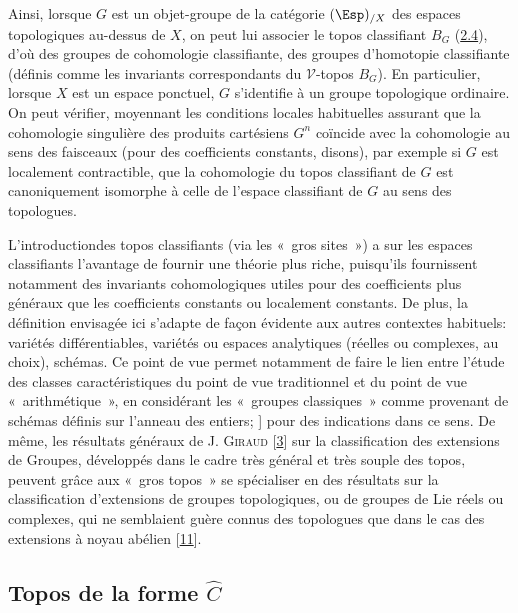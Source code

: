 \documentclass[10pt]{../fichiers-configuration-latex/smfart}
\begin{document}
Ainsi, lorsque $G$ est un objet-groupe de la catégorie $(\Esp)_{/X}$
des espaces topologiques au-dessus de $X$, on peut lui associer le
topos classifiant $B_G$ (\hyperref[IV.subsec2.4]{2.4}), d'où des groupes de
cohomologie classifiante, des groupes d'homotopie classifiante \etc
(définis comme les invariants correspondants du $𝒱$-topos
$B_G$). En particulier, lorsque $X$ est un espace ponctuel, $G$
s'identifie à un groupe topologique ordinaire. On peut vérifier,
moyennant les conditions locales habituelles assurant que la
cohomologie singulière des produits cartésiens $G^n$ coïncide avec
la cohomologie au sens des faisceaux (pour des coefficients
constants, disons), par exemple si $G$ est localement contractible,
que la cohomologie du topos classifiant de $G$ est canoniquement
isomorphe à celle de l'espace classifiant de $G$ au sens des
topologues.

L'introduction\pageoriginale des topos classifiants (via les « gros sites ») a sur les espaces classifiants l'avantage de fournir
une théorie plus riche, puisqu'ils fournissent notamment des
invariants cohomologiques utiles pour des coefficients plus
généraux que les coefficients constants ou localement constants.
De plus, la définition envisagée ici s'adapte de façon
évidente aux autres contextes habituels: variétés
différentiables, variétés ou espaces analytiques (réelles ou
complexes, au choix), schémas. Ce point de vue permet notamment de
faire le lien entre l'étude des classes caractéristiques du
point de vue traditionnel et du point de vue « arithmétique »,
en considérant les « groupes classiques »  comme provenant de
schémas définis sur l'anneau des entiers; \cf [\hyperref[IV.sec7]{7}]
pour des indications dans ce sens. De même, les résultats
généraux de J. \textsc{Giraud} [\hyperref[IV.sec3]{3}] sur la
classification des extensions de Groupes, développés dans le
cadre très général et très souple des topos, peuvent grâce aux « gros topos » se spécialiser en des résultats sur la
classification d'extensions de groupes topologiques, ou de groupes
de Lie réels ou complexes, qui ne semblaient guère connus des
topologues que dans le cas des extensions à noyau abélien
[\hyperref[IV.sec11]{11}].

\subsection{Topos de la forme $\widehat{C}$}
\end{document}
